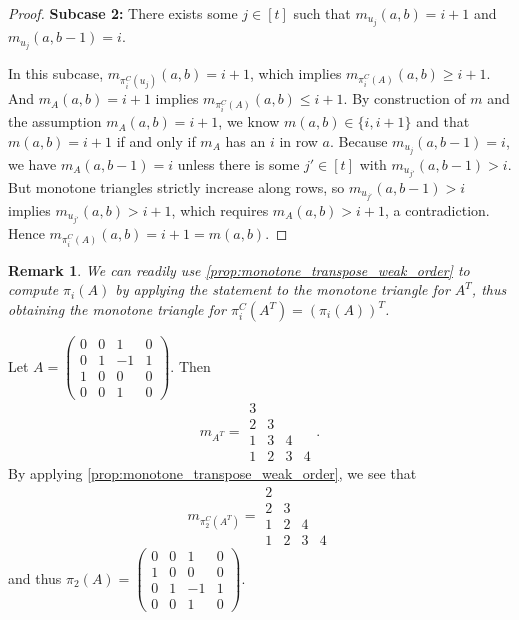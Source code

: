 \documentclass[12 pt]{amsart}
\newtheorem{remark}[Theorem]{Remark}
\numberwithin{equation}{section}
\theoremstyle{remark}
\newenvironment{example}
  {\pushQED{\qed}\renewcommand{\qedsymbol}{$\diamondsuit$}\examplex}
  {\popQED\endexamplex}
\begin{document}
\begin{proof}
\noindent\textbf{Subcase 2:}
There exists some $j \in [t]$ such that
$m_{u_j}(a,b) = i+1$ and $m_{u_j}(a,b-1) = i$.

In this subcase, $m_{\pi_i^C(u_j)}(a,b) = i+1$, which implies
$m_{\pi_i^C(A)}(a,b) \geq i+1$. And $m_A(a,b) = i+1$ implies $m_{\pi_i^C(A)}(a,b) \leq i+1$. By construction of $m$ and the assumption $m_A(a,b) = i+1$, we know $m(a,b) \in \{i, i+1\}$ and that $m(a,b) = i+1$ if and only if $m_A$ has an $i$ in row $a$. Because $m_{u_j}(a,b-1) = i$, we have $m_A(a,b-1) = i$ unless there is some $j' \in [t]$ with $m_{u_{j'}}(a,b-1) >i$. But monotone triangles strictly increase along rows, so $m_{u_{j'}}(a,b-1) >i$ implies $m_{u_{j'}}(a,b) >i+1$, which requires $m_A(a,b)>i+1$, a contradiction. Hence $m_{\pi_i^C(A)}(a,b) = i+1 = m(a,b)$.
\end{proof}

\begin{remark}
    We can readily use \cref{prop:monotone_transpose_weak_order} to compute $\pi_i(A)$ by applying the statement to the monotone triangle for $A^T$, thus obtaining the monotone triangle for $\pi_i^C(A^T)=(\pi_i(A))^T$. 
\end{remark}

\begin{example}
    Let $A=\begin{pmatrix}
0  &0 & 1 & 0\\
 0 & 1& -1 & 1\\
 1 & 0 & 0 & 0\\
 0 & 0 & 1 & 0
    \end{pmatrix}$.  Then \[m_{A^T}=
\begin{array}{cccc}
3\\
2&3\\
1&3&4\\
1&2&3&4
\end{array}.
\]
By applying \cref{prop:monotone_transpose_weak_order}, we see that 
\[m_{\pi_2^C(A^T)}=
\begin{array}{cccc}
2\\
2&3\\
1&2&4\\
1&2&3&4
\end{array}
\]
and thus
$\pi_2(A)=\begin{pmatrix}
0  &0 & 1 & 0\\
 1 & 0& 0 & 0\\
 0 & 1 & -1 & 1\\
 0 & 0 & 1 & 0
    \end{pmatrix}$.
\end{example}
\end{document}
